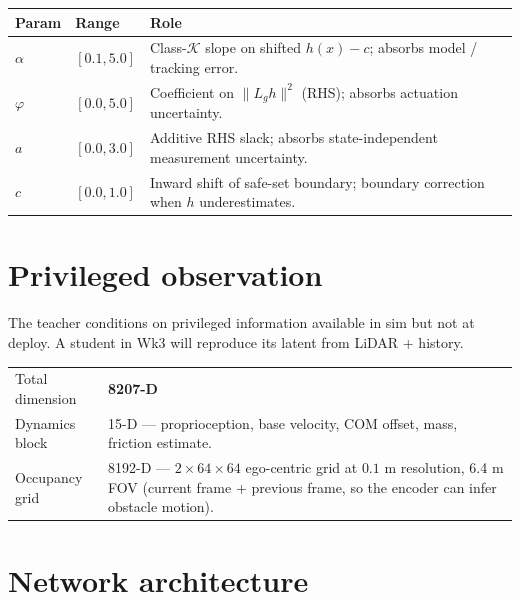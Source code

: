 \documentclass[11pt]{article}
\begin{document}
\begin{small}
\begin{tabularx}{\linewidth}{@{}llX@{}}
\toprule
Param     & Range          & Role \\
\midrule
$\alpha$  & $[0.1, 5.0]$   & Class-$\mathcal{K}$ slope on shifted $h(x)-c$; absorbs model / tracking error. \\
$\varphi$ & $[0.0, 5.0]$   & Coefficient on $\lVert L_g h\rVert^{2}$ (RHS); absorbs actuation uncertainty. \\
$a$       & $[0.0, 3.0]$   & Additive RHS slack; absorbs state-independent measurement uncertainty. \\
$c$       & $[0.0, 1.0]$   & Inward shift of safe-set boundary; boundary correction when $h$ underestimates. \\
\bottomrule
\end{tabularx}
\end{small}

\section{Privileged observation}

The teacher conditions on privileged information available in sim but not at
deploy. A student in Wk3 will reproduce its latent from LiDAR + history.

\begin{small}
\begin{tabularx}{\linewidth}{@{}lX@{}}
\toprule
Total dimension   & \textbf{8207-D} \\
Dynamics block    & 15-D --- proprioception, base velocity, COM offset, mass, friction estimate. \\
Occupancy grid    & 8192-D --- $2 \times 64 \times 64$ ego-centric grid at $0.1$ m resolution, 6.4 m FOV (current frame + previous frame, so the encoder can infer obstacle motion). \\
\bottomrule
\end{tabularx}
\end{small}

\section{Network architecture}
\end{document}
